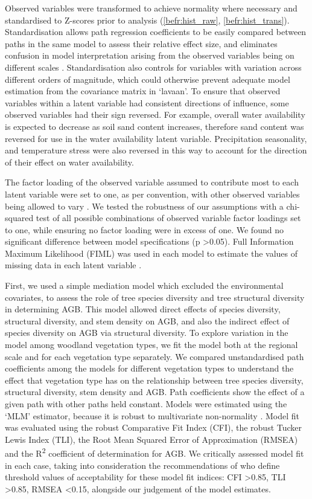 \begin{refsection}
Observed variables were transformed to achieve normality where necessary and standardised to Z-scores prior to analysis (\autoref{befr:hist_raw}, \autoref{befr:hist_trans}). Standardisation allows path regression coefficients to be easily compared between paths in the same model to assess their relative effect size, and eliminates confusion in model interpretation arising from the observed variables being on different scales \citep{Beaujean2014}. Standardisation also controls for variables with variation across different orders of magnitude, which could otherwise prevent adequate model estimation from the covariance matrix in `lavaan'. To ensure that observed variables within a latent variable had consistent directions of influence, some observed variables had their sign reversed. For example, overall water availability is expected to decrease as soil sand content increases, therefore sand content was reversed for use in the water availability latent variable. Precipitation seasonality, and temperature stress were also reversed in this way to account for the direction of their effect on water availability. 

The factor loading of the observed variable assumed to contribute most to each latent variable were set to one, as per convention, with other observed variables being allowed to vary \citep{Beaujean2014}. We tested the robustness of our assumptions with a chi-squared test of all possible combinations of observed variable factor loadings set to one, while ensuring no factor loading were in excess of one. We found no significant difference between model specifications (p >0.05). Full Information Maximum Likelihood (FIML) was used in each model to estimate the values of missing data in each latent variable \citep{Cham2017}.

First, we used a simple mediation model which excluded the environmental covariates, to assess the role of tree species diversity and tree structural diversity in determining AGB. This model allowed direct effects of species diversity, structural diversity, and stem density on AGB, and also the indirect effect of species diversity on AGB via structural diversity. To explore variation in the model among woodland vegetation types, we fit the model both at the regional scale and for each vegetation type separately. We compared unstandardised path coefficients among the models for different vegetation types to understand the effect that vegetation type has on the relationship between tree species diversity, structural diversity, stem density and AGB. Path coefficients show the effect of a given path with other paths held constant. Models were estimated using the `MLM' estimator, because it is robust to multivariate non-normality \citep{Shapiro1983}. Model fit was evaluated using the robust Comparative Fit Index (CFI), the robust Tucker Lewis Index (TLI), the Root Mean Squared Error of Approximation (RMSEA) and the R\textsuperscript{2} coefficient of determination for AGB. We critically assessed model fit in each case, taking into consideration the recommendations of \citet{Hu1999} who define threshold values of acceptability for these model fit indices: CFI >0.85, TLI >0.85, RMSEA <0.15, alongside our judgement of the model estimates.


\end{refsection}
